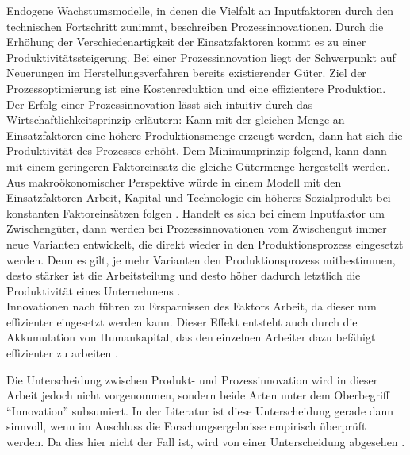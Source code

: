 Endogene Wachstumsmodelle, in denen die Vielfalt an Inputfaktoren durch den technischen Fortschritt zunimmt, beschreiben Prozessinnovationen. Durch die Erh{\"o}hung der Verschiedenartigkeit der Einsatzfaktoren kommt es zu einer Produktivit{\"a}tssteigerung. Bei einer Prozessinnovation liegt der Schwerpunkt auf Neuerungen im Herstellungsverfahren bereits existierender G{\"u}ter. Ziel der Prozessoptimierung ist eine Kostenreduktion und eine effizientere Produktion. Der Erfolg einer Prozessinnovation l{\"a}sst sich intuitiv durch das Wirtschaftlichkeitsprinzip erl{\"a}utern: Kann mit der gleichen Menge an Einsatzfaktoren eine h{\"o}here Produktionsmenge erzeugt werden, dann hat sich die Produktivit{\"a}t des Prozesses erh{\"o}ht. Dem Minimumprinzip folgend, kann dann mit einem geringeren Faktoreinsatz die gleiche G{\"u}termenge hergestellt werden. Aus makro{\"o}konomischer Perspektive w{\"u}rde in einem Modell mit den Einsatzfaktoren Arbeit, Kapital und Technologie ein h{\"o}heres Sozialprodukt bei konstanten Faktoreins{\"a}tzen folgen \citep[Kapitel 10]{Frenkel.1999}.
Handelt es sich bei einem Inputfaktor um Zwischengüter, dann werden bei Prozessinnovationen vom Zwischengut immer neue Varianten entwickelt, die direkt wieder in den Produktionsprozess eingesetzt werden. Denn es gilt, je mehr Varianten den Produktionsprozess mitbestimmen, desto st{\"a}rker ist die Arbeitsteilung und desto höher dadurch letztlich die Produktivit{\"a}t eines Unternehmens \citep{Romer.1987,Romer.1990}.\\


Innovationen nach \citet{Hicks.1932} f{\"u}hren zu Ersparnissen des Faktors Arbeit, da dieser nun effizienter eingesetzt werden kann. Dieser Effekt entsteht auch durch die Akkumulation von Humankapital, das den einzelnen Arbeiter dazu befähigt effizienter zu arbeiten \citep{Arrow.1969}.\newline


Die Unterscheidung zwischen Produkt- und Prozessinnovation wird in dieser Arbeit jedoch nicht vorgenommen, sondern beide Arten unter dem Oberbegriff "`Innovation"' subsumiert. In der Literatur ist diese Unterscheidung gerade dann sinnvoll, wenn im Anschluss die Forschungsergebnisse empirisch {\"u}berpr{\"u}ft werden. Da dies hier nicht der Fall ist, wird von einer Unterscheidung abgesehen \citep{Acemoglu.2009}.\\


